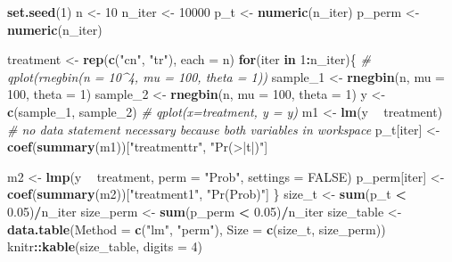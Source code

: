 \documentclass[]{book}
\newenvironment{Shaded}{\begin{snugshade}}{\end{snugshade}}
\newcommand{\CommentTok}[1]{\textcolor[rgb]{0.56,0.35,0.01}{\textit{#1}}}
\newcommand{\ControlFlowTok}[1]{\textcolor[rgb]{0.13,0.29,0.53}{\textbf{#1}}}
\newcommand{\DataTypeTok}[1]{\textcolor[rgb]{0.13,0.29,0.53}{#1}}
\newcommand{\DecValTok}[1]{\textcolor[rgb]{0.00,0.00,0.81}{#1}}
\newcommand{\FloatTok}[1]{\textcolor[rgb]{0.00,0.00,0.81}{#1}}
\newcommand{\KeywordTok}[1]{\textcolor[rgb]{0.13,0.29,0.53}{\textbf{#1}}}
\newcommand{\NormalTok}[1]{#1}
\newcommand{\OperatorTok}[1]{\textcolor[rgb]{0.81,0.36,0.00}{\textbf{#1}}}
\newcommand{\OtherTok}[1]{\textcolor[rgb]{0.56,0.35,0.01}{#1}}
\newcommand{\StringTok}[1]{\textcolor[rgb]{0.31,0.60,0.02}{#1}}
\begin{document}
\begin{Shaded}
\begin{Highlighting}[]
\KeywordTok{set.seed}\NormalTok{(}\DecValTok{1}\NormalTok{)}
\NormalTok{n <-}\StringTok{ }\DecValTok{10}
\NormalTok{n_iter <-}\StringTok{ }\DecValTok{10000}
\NormalTok{p_t <-}\StringTok{ }\KeywordTok{numeric}\NormalTok{(n_iter)}
\NormalTok{p_perm <-}\StringTok{ }\KeywordTok{numeric}\NormalTok{(n_iter)}

\NormalTok{treatment <-}\StringTok{ }\KeywordTok{rep}\NormalTok{(}\KeywordTok{c}\NormalTok{(}\StringTok{"cn"}\NormalTok{, }\StringTok{"tr"}\NormalTok{), }\DataTypeTok{each =}\NormalTok{ n)}
\ControlFlowTok{for}\NormalTok{(iter }\ControlFlowTok{in} \DecValTok{1}\OperatorTok{:}\NormalTok{n_iter)\{}
  \CommentTok{#  qplot(rnegbin(n = 10^4, mu = 100, theta = 1))}
\NormalTok{  sample_}\DecValTok{1}\NormalTok{ <-}\StringTok{ }\KeywordTok{rnegbin}\NormalTok{(n, }\DataTypeTok{mu =} \DecValTok{100}\NormalTok{, }\DataTypeTok{theta =} \DecValTok{1}\NormalTok{)}
\NormalTok{  sample_}\DecValTok{2}\NormalTok{ <-}\StringTok{ }\KeywordTok{rnegbin}\NormalTok{(n, }\DataTypeTok{mu =} \DecValTok{100}\NormalTok{, }\DataTypeTok{theta =} \DecValTok{1}\NormalTok{)}
\NormalTok{  y <-}\StringTok{ }\KeywordTok{c}\NormalTok{(sample_}\DecValTok{1}\NormalTok{, sample_}\DecValTok{2}\NormalTok{)}
  \CommentTok{# qplot(x=treatment, y = y)}
\NormalTok{  m1 <-}\StringTok{ }\KeywordTok{lm}\NormalTok{(y }\OperatorTok{~}\StringTok{ }\NormalTok{treatment) }\CommentTok{# no data statement necessary because both variables in workspace}
\NormalTok{  p_t[iter] <-}\StringTok{ }\KeywordTok{coef}\NormalTok{(}\KeywordTok{summary}\NormalTok{(m1))[}\StringTok{"treatmenttr"}\NormalTok{, }\StringTok{"Pr(>|t|)"}\NormalTok{]}
  
\NormalTok{  m2 <-}\StringTok{ }\KeywordTok{lmp}\NormalTok{(y }\OperatorTok{~}\StringTok{ }\NormalTok{treatment,}
            \DataTypeTok{perm =} \StringTok{"Prob"}\NormalTok{,}
            \DataTypeTok{settings =} \OtherTok{FALSE}\NormalTok{)}
\NormalTok{  p_perm[iter] <-}\StringTok{ }\KeywordTok{coef}\NormalTok{(}\KeywordTok{summary}\NormalTok{(m2))[}\StringTok{"treatment1"}\NormalTok{, }\StringTok{"Pr(Prob)"}\NormalTok{]}
\NormalTok{\}}
\NormalTok{size_t <-}\StringTok{ }\KeywordTok{sum}\NormalTok{(p_t }\OperatorTok{<}\StringTok{ }\FloatTok{0.05}\NormalTok{)}\OperatorTok{/}\NormalTok{n_iter}
\NormalTok{size_perm <-}\StringTok{ }\KeywordTok{sum}\NormalTok{(p_perm }\OperatorTok{<}\StringTok{ }\FloatTok{0.05}\NormalTok{)}\OperatorTok{/}\NormalTok{n_iter}
\NormalTok{size_table <-}\StringTok{ }\KeywordTok{data.table}\NormalTok{(}\DataTypeTok{Method =} \KeywordTok{c}\NormalTok{(}\StringTok{"lm"}\NormalTok{, }\StringTok{"perm"}\NormalTok{),}
                         \DataTypeTok{Size =} \KeywordTok{c}\NormalTok{(size_t, size_perm))}
\NormalTok{knitr}\OperatorTok{::}\KeywordTok{kable}\NormalTok{(size_table, }\DataTypeTok{digits =} \DecValTok{4}\NormalTok{)}
\end{Highlighting}
\end{Shaded}
\end{document}

